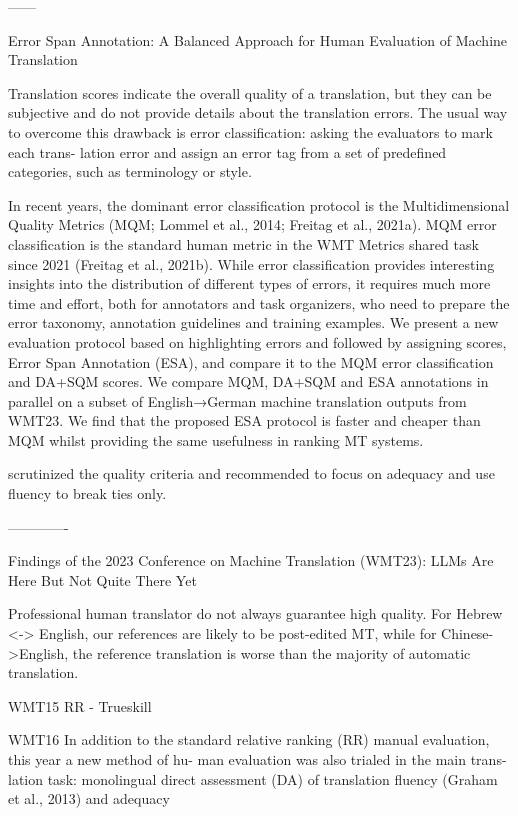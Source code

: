 ------



Error Span Annotation: A Balanced Approach for Human Evaluation of Machine Translation
\cite{kocmi-etal-2024-error}

Translation scores indicate the overall quality of a translation, but they can be subjective and do not provide details about the translation errors. The usual way to overcome this drawback is error classification: asking the evaluators to mark each trans-
lation error and assign an error tag from a set of predefined categories, such as terminology or style.

In recent years, the dominant error classification protocol is the Multidimensional Quality Metrics (MQM; Lommel et al., 2014; Freitag et al., 2021a). MQM error classification is the standard human metric in the WMT Metrics shared task since 2021
(Freitag et al., 2021b). While error classification provides interesting insights into the distribution of different types of errors, it requires much more time and effort, both for annotators and task organizers, who need to prepare the error taxonomy, annotation guidelines and training examples. We present a new evaluation protocol based on highlighting errors and followed by assigning scores, Error Span Annotation (ESA), and
compare it to the MQM error classification and DA+SQM scores. We compare MQM, DA+SQM
and ESA annotations in parallel on a subset of English→German machine translation outputs
from WMT23. We find that the proposed ESA protocol is faster and cheaper than MQM whilst
providing the same usefulness in ranking MT systems.

\cite{wmt16} scrutinized the quality criteria and recommended to focus on adequacy and use fluency to break ties only. 

-------------


Findings of the 2023 Conference on Machine Translation (WMT23): LLMs Are Here But Not Quite There Yet

Professional human translator do not always guarantee high quality. For Hebrew <-> English, our references are likely to be post-edited MT, while for Chinese->English, the reference translation is worse than the majority of automatic translation.


WMT15
RR - Trueskill

WMT16
\cite{wmt16}
In addition to the standard relative ranking (RR) manual evaluation, this year a new method of hu- man evaluation was also trialed in the main trans- lation task: monolingual direct assessment (DA) of translation fluency (Graham et al., 2013) and adequacy \citep{graham-etal-2013-continuous, graham-etal-2014-machine, graham_2017}

